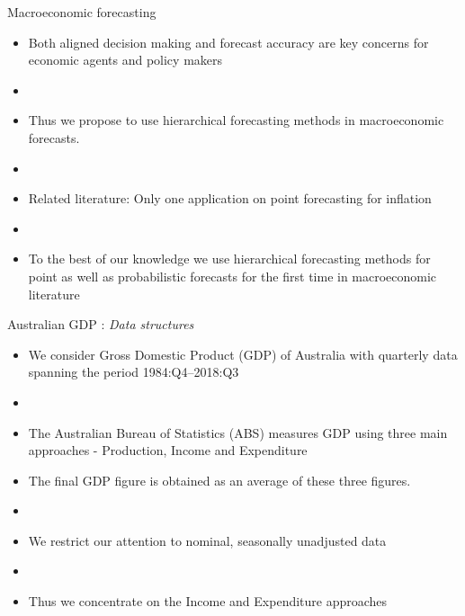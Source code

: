 \documentclass[11pt,xcolor=dvipsnames,handout]{beamer} %
\begin{document}
\begin{frame}{Macroeconomic forecasting}
\begin{itemize}[<+-| alert@+>]
	\item Both aligned decision making and forecast accuracy are key concerns for economic agents and policy makers
	\item[]
	\item Thus we propose to use hierarchical forecasting methods in macroeconomic forecasts.
	\item[]
	\item Related literature: Only one application on point forecasting for inflation \citep{capistran2010multi,weiss2018essays}
	\item[]
	\item To the best of our knowledge we use hierarchical forecasting methods for point as well as probabilistic forecasts for the first time in macroeconomic literature 
\end{itemize}
\end{frame}



\begin{frame}{Australian GDP : \textit{Data structures}}
\begin{itemize}[<+-| alert@+>]
	\item We consider Gross Domestic Product (GDP) of Australia with quarterly data spanning the period 1984:Q4--2018:Q3
	\item[]
	\item The Australian Bureau of Statistics (ABS) measures GDP using three main approaches - Production, Income and Expenditure
	\item[] The final GDP figure is obtained as an average of these three figures.
	\item[]
	\item We restrict our attention to nominal, seasonally unadjusted data
	\item[]
	\item Thus we concentrate on the Income and Expenditure approaches  
\end{itemize}
\end{frame}


\end{document}
